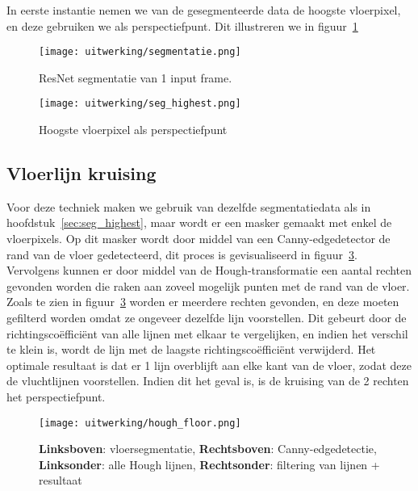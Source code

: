In eerste instantie nemen we van de gesegmenteerde data de hoogste vloerpixel, en deze gebruiken we als perspectiefpunt.
Dit illustreren we in figuur~\ref{fig:floor_seg}

\begin{figure}
    \centering
    \texttt{[image: uitwerking/segmentatie.png]}
    \caption{ResNet segmentatie van 1 input frame.}
    \label{fig:floor_seg}
\end{figure}
\begin{figure}
    \centering
    \texttt{[image: uitwerking/seg\_highest.png]}
    \caption{Hoogste vloerpixel als perspectiefpunt}
    \label{fig:highest_pixel}
\end{figure}


\subsection{Vloerlijn kruising}\label{sec:hough_floor}
Voor deze techniek maken we gebruik van dezelfde segmentatiedata als in hoofdstuk~\ref{sec:seg_highest}, maar wordt er een masker gemaakt met enkel de vloerpixels.
Op dit masker wordt door middel van een Canny-edgedetector de rand van de vloer gedetecteerd, dit proces is gevisualiseerd in figuur~\ref{fig:hough_floor}.
Vervolgens kunnen er door middel van de Hough-transformatie een aantal rechten gevonden worden die raken aan zoveel mogelijk punten met de rand van de vloer.
Zoals te zien in figuur~\ref{fig:hough_floor} worden er meerdere rechten gevonden, en deze moeten gefilterd worden omdat ze ongeveer dezelfde lijn voorstellen.
Dit gebeurt door de richtingsco\"{e}ffici\"{e}nt van alle lijnen met elkaar te vergelijken, en indien het verschil te klein is, wordt de lijn met de laagste
richtingsco\"{e}ffici\"{e}nt verwijderd.
Het optimale resultaat is dat er 1 lijn overblijft aan elke kant van de vloer, zodat deze de vluchtlijnen voorstellen.
Indien dit het geval is, is de kruising van de 2 rechten het perspectiefpunt.

\begin{figure}
    \texttt{[image: uitwerking/hough\_floor.png]}
    \caption{\textbf{Linksboven}: vloersegmentatie, \textbf{Rechtsboven}: Canny-edgedetectie, \textbf{Linksonder}: alle Hough lijnen, \textbf{Rechtsonder}: filtering van lijnen + resultaat}
    \label{fig:hough_floor}
\end{figure}


